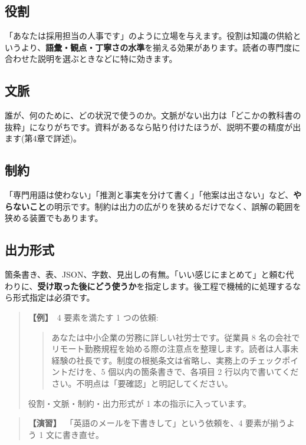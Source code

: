 \documentclass{article}
\begin{document}
\subsection{役割}

「あなたは採用担当の人事です」のように立場を与えます。役割は知識の供給というより、\textbf{語彙・観点・丁寧さの水準}を揃える効果があります。読者の専門度に合わせた説明を選ぶときなどに特に効きます。

\subsection{文脈}

誰が、何のために、どの状況で使うのか。文脈がない出力は「どこかの教科書の抜粋」になりがちです。資料があるなら貼り付けたほうが、説明不要の精度が出ます(第4章で詳述)。

\subsection{制約}

「専門用語は使わない」「推測と事実を分けて書く」「他案は出さない」など、\textbf{やらないこと}の明示です。制約は出力の広がりを狭めるだけでなく、誤解の範囲を狭める装置でもあります。

\subsection{出力形式}

箇条書き、表、JSON、字数、見出しの有無。「いい感じにまとめて」と頼む代わりに、\textbf{受け取った後にどう使うか}を指定します。後工程で機械的に処理するなら形式指定は必須です。

\begin{quote}
\textbf{【例】}\ 4 要素を満たす 1 つの依頼:
\begin{quote}
あなたは中小企業の労務に詳しい社労士です。従業員 8 名の会社でリモート勤務規程を始める際の注意点を整理します。読者は人事未経験の社長です。制度の根拠条文は省略し、実務上のチェックポイントだけを、5 個以内の箇条書きで、各項目 2 行以内で書いてください。不明点は「要確認」と明記してください。
\end{quote}
役割・文脈・制約・出力形式が 1 本の指示に入っています。
\end{quote}

\begin{quote}
\textbf{【演習】}\ 「英語のメールを下書きして」という依頼を、4 要素が揃うよう 1 文に書き直せ。
\end{quote}
\end{document}
